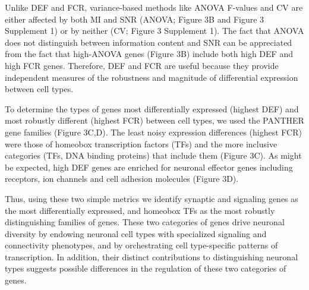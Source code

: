 Unlike DEF and FCR, variance-based methods like ANOVA F-values and CV are either affected by both MI and SNR (ANOVA; Figure 3B and Figure 3 Supplement 1) or by neither (CV; Figure 3 Supplement 1). The fact that ANOVA does not distinguish between information content and SNR can be appreciated from the fact that high-ANOVA genes (Figure 3B) include both high DEF and high FCR genes. Therefore, DEF and FCR are useful because they provide independent measures of the robustness and magnitude of differential expression between cell types.

To determine the types of genes most differentially expressed (highest DEF) and most robustly different (highest FCR) between cell types, we used the PANTHER gene families \citep{Mi_2016} (Figure 3C,D). The least noisy expression differences (highest FCR) were those of homeobox transcription factors (TFs) and the more inclusive categories (TFs, DNA binding proteins) that include them (Figure 3C). As might be expected, high DEF genes are enriched for neuronal effector genes including receptors, ion channels and cell adhesion molecules (Figure 3D). 

Thus, using these two simple metrics we identify synaptic and signaling genes as the most differentially expressed, and homeobox TFs as the most robustly distinguishing families of genes. These two categories of genes drive neuronal diversity by endowing neuronal cell types with specialized signaling and connectivity phenotypes, and by orchestrating cell type-specific patterns of transcription. In addition, their distinct contributions to distinguishing neuronal types suggests possible differences in the regulation of these two categories of genes. 


